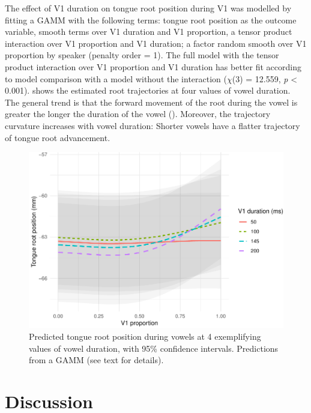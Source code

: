 \documentclass[12pt,]{article}
\begin{document}
The effect of V1 duration on tongue root position during V1 was modelled
by fitting a GAMM with the following terms: tongue root position as the
outcome variable, smooth terms over V1 duration and V1 proportion, a
tensor product interaction over V1 proportion and V1 duration; a factor
random smooth over V1 proportion by speaker (penalty order = 1). The
full model with the tensor product interaction over V1 proportion and V1
duration has better fit according to model comparison with a model
without the interaction (\(\chi\)(3) = 12.559, \emph{p} \textless{}
0.001).  shows the estimated root trajectories at
four values of vowel duration. The general trend is that the forward
movement of the root during the vowel is greater the longer the duration
of the vowel (). Moreover, the trajectory
curvature increases with vowel duration: Shorter vowels have a flatter
trajectory of tongue root advancement.

\begin{figure}
\includegraphics[width=\linewidth]{2018-tra_files/figure-latex/tra-gam-2-plot-1} \caption{Predicted tongue root position during vowels at 4 exemplifying values of vowel duration, with 95\% confidence intervals. Predictions from a GAMM (see text for details).}\label{f:tra-gam-2-plot}
\end{figure}

\hypertarget{discussion}{%
\section{Discussion}\label{discussion}}

\label{s:discussion}
\end{document}
